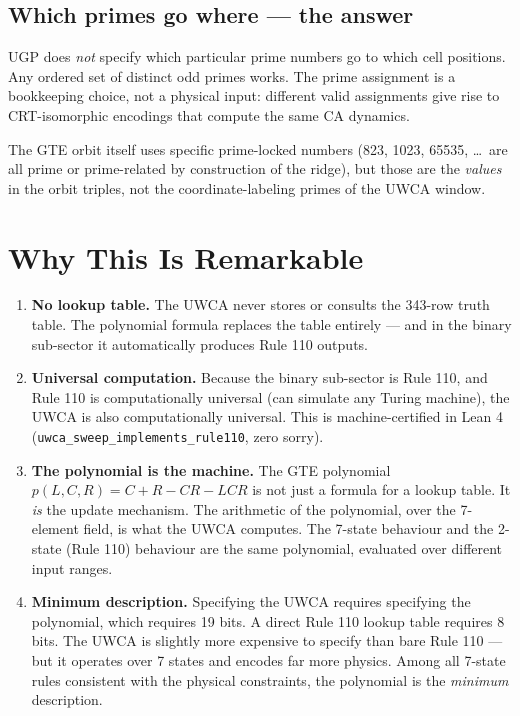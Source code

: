 \documentclass[11pt,a4paper]{article}
\begin{document}
\subsection{Which primes go where — the answer}

UGP does \emph{not} specify which particular prime numbers go to which cell
positions.  Any ordered set of distinct odd primes works.  The prime
assignment is a bookkeeping choice, not a physical input: different valid
assignments give rise to CRT-isomorphic encodings that compute the same CA
dynamics.

The GTE orbit itself uses specific prime-locked numbers (823, 1023, 65535,
\ldots\ are all prime or prime-related by construction of the ridge), but
those are the \emph{values} in the orbit triples, not the coordinate-labeling
primes of the UWCA window.

\section{Why This Is Remarkable}

\begin{enumerate}
  \item \textbf{No lookup table.}  The UWCA never stores or consults the
        343-row truth table.  The polynomial formula replaces the table
        entirely — and in the binary sub-sector it automatically produces
        Rule 110 outputs.

  \item \textbf{Universal computation.}  Because the binary sub-sector is
        Rule 110, and Rule 110 is computationally universal (can simulate
        any Turing machine), the UWCA is also computationally universal.
        This is machine-certified in Lean 4
        (\texttt{uwca\_sweep\_implements\_rule110}, zero sorry).

  \item \textbf{The polynomial is the machine.}  The GTE polynomial
        $p(L,C,R) = C + R - CR - LCR$ is not just a formula for a lookup
        table.  It \emph{is} the update mechanism.  The arithmetic of the
        polynomial, over the 7-element field, is what the UWCA computes.
        The 7-state behaviour and the 2-state (Rule 110) behaviour are the
        same polynomial, evaluated over different input ranges.

  \item \textbf{Minimum description.}  Specifying the UWCA requires
        specifying the polynomial, which requires 19 bits.  A direct Rule 110
        lookup table requires 8 bits.  The UWCA is slightly more expensive to
        specify than bare Rule 110 — but it operates over 7 states and
        encodes far more physics.  Among all 7-state rules consistent with the
        physical constraints, the polynomial is the \emph{minimum}
        description.
\end{enumerate}
\end{document}
